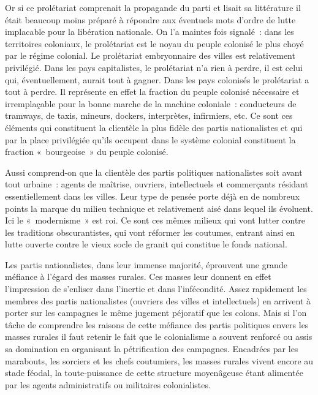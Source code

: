 \documentclass[french,twoside]{book} %
\begin{document}
Or si ce prolétariat comprenait la propagande du parti et lisait sa littérature il était beaucoup moins préparé à répondre aux éventuels mots d’ordre de lutte implacable pour la libération nationale. On l’a maintes fois signalé : dans les territoires coloniaux, le prolétariat est le noyau du peuple colonisé le plus choyé par le régime colonial. Le prolétariat embryonnaire des villes est relativement privilégié. Dans les pays capitalistes, le prolétariat n’a rien à perdre, il est celui qui, éventuellement, aurait tout à gagner. Dans les pays colonisés le prolétariat a tout à perdre. Il représente en effet la fraction du peuple colonisé nécessaire et irremplaçable pour la bonne marche de la machine coloniale : conducteurs de tramways, de taxis, mineurs, dockers, interprètes, infirmiers, etc. Ce sont ces éléments qui constituent la clientèle la plus fidèle des partis nationalistes et qui par la place privilégiée qu’ils occupent dans le système colonial constituent la fraction « bourgeoise » du peuple colonisé.\par
Aussi comprend-on que la clientèle des partis politiques nationalistes soit avant tout urbaine : agents de maîtrise, ouvriers, intellectuels et commerçants résidant essentiellement dans les villes. Leur type de pensée porte déjà en de nombreux points la marque du milieu technique et relativement aisé dans lequel ils évoluent. Ici le « modernisme » est roi. Ce sont ces   mêmes milieux qui vont lutter contre les traditions obscurantistes, qui vont réformer les coutumes, entrant ainsi en lutte ouverte contre le vieux socle de granit qui constitue le fonds national.\par
\bigbreak
\noindent Les partis nationalistes, dans leur immense majorité, éprouvent une grande méfiance à l’égard des masses rurales. Ces masses leur donnent en effet l’impression de s’enliser dans l’inertie et dans l’infécondité. Assez rapidement les membres des partis nationalistes (ouvriers des villes et intellectuels) en arrivent à porter sur les campagnes le même jugement péjoratif que les colons. Mais si l’on tâche de comprendre les raisons de cette méfiance des partis politiques envers les masses rurales il faut retenir le fait que le colonialisme a souvent renforcé ou assis sa domination en organisant la pétrification des campagnes. Encadrées par les marabouts, les sorciers et les chefs coutumiers, les masses rurales vivent encore au stade féodal, la toute-puissance de cette structure moyenâgeuse étant alimentée par les agents administratifs ou militaires colonialistes.\par
\end{document}
